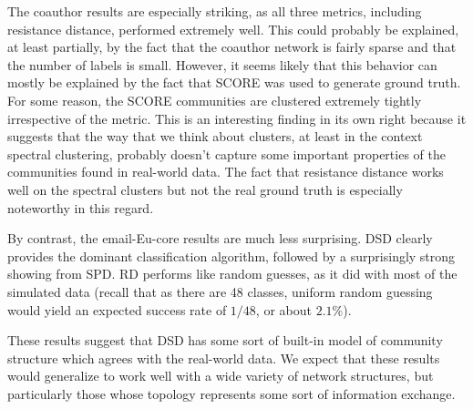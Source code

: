 The coauthor results are especially striking, as all three metrics, including resistance distance,
performed extremely well. This could probably be explained, at least partially, by the fact that the
coauthor network is fairly sparse and that the number of labels is small. However, it seems likely
that this behavior can mostly be explained by the fact that SCORE was used to generate ground truth.
For some reason, the SCORE communities are clustered extremely tightly irrespective of the metric.
This is an interesting finding in its own right because it suggests that the way that we think about
clusters, at least in the context spectral clustering, probably doesn't capture some important
properties of the communities found in real-world data. The fact that resistance distance works well
on the spectral clusters but not the real ground truth is especially noteworthy in this regard.

By contrast, the email-Eu-core results are much less surprising. DSD clearly provides the dominant
classification algorithm, followed by a surprisingly strong showing from SPD. RD performs like
random guesses, as it did with most of the simulated data (recall that as there are 48 classes,
uniform random guessing would yield an expected success rate of $1/48$, or about $2.1\%$).

These results suggest that DSD has some sort of built-in model of community structure which agrees
with the real-world data. We expect that these results would generalize to work well with a wide
variety of network structures, but particularly those whose topology represents some sort of
information exchange.


